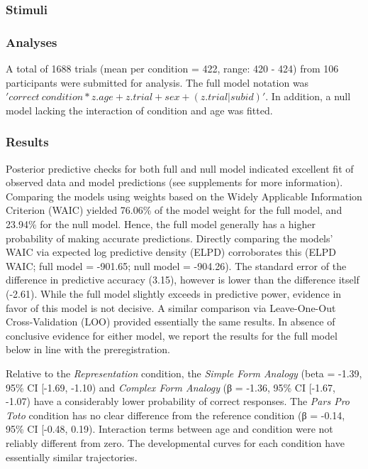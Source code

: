 \documentclass[
  man]{apa6}
\begin{document}
\subsubsection{Stimuli}\label{stimuli}

\subsubsection{Analyses}\label{analyses}

A total of 1688 trials (mean per condition = 422, range: 420 - 424) from 106 participants were submitted for analysis. The full model notation was \('correct~condition*z.age+z.trial+sex+(z.trial|subid)'\). In addition, a null model lacking the interaction of condition and age was fitted.

\subsubsection{Results}\label{results}

Posterior predictive checks for both full and null model indicated excellent fit of observed data and model predictions (see supplements for more information). Comparing the models using weights based on the Widely Applicable Information Criterion (WAIC) yielded 76.06\% of the model weight for the full model, and 23.94\% for the null model. Hence, the full model generally has a higher probability of making accurate predictions. Directly comparing the models' WAIC via expected log predictive density (ELPD) corroborates this (ELPD WAIC; full model = -901.65; null model = -904.26). The standard error of the difference in predictive accuracy (3.15), however is lower than the difference itself (-2.61). While the full model slightly exceeds in predictive power, evidence in favor of this model is not decisive. A similar comparison via Leave-One-Out Cross-Validation (LOO) provided essentially the same results. In absence of conclusive evidence for either model, we report the results for the full model below in line with the preregistration.

Relative to the \emph{Representation} condition, the \emph{Simple Form Analogy} (beta = -1.39, 95\% CI {[}-1.69, -1.10) and \emph{Complex Form Analogy} (β = -1.36, 95\% CI {[}-1.67, -1.07) have a considerably lower probability of correct responses. The \emph{Pars Pro Toto} condition has no clear difference from the reference condition (β = -0.14, 95\% CI {[}-0.48, 0.19). Interaction terms between age and condition were not reliably different from zero. The developmental curves for each condition have essentially similar trajectories.
\end{document}
